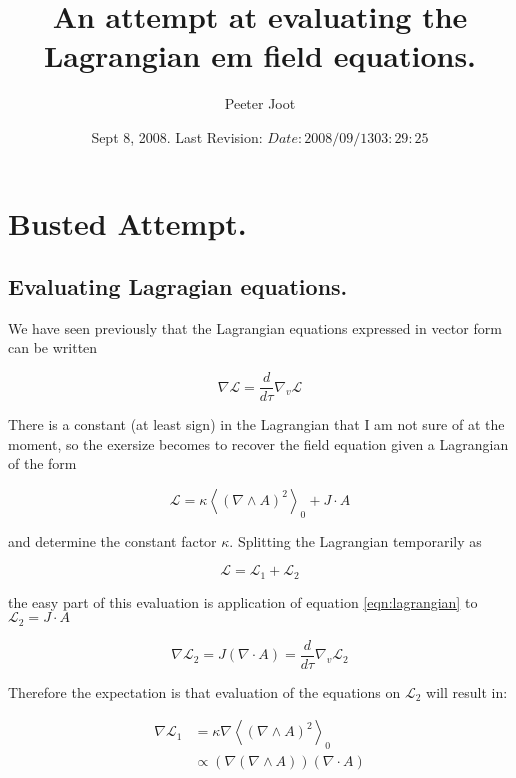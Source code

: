 \documentclass{article}
\title{ An attempt at evaluating the Lagrangian em field equations. }
\author{Peeter Joot}
\date{ Sept 8, 2008.  Last Revision: $Date: 2008/09/13 03:29:25 $ }
\newcommand{\LL}[0]{\mathcal{L}}
\newcommand{\gpgrade}[2] {{\left\langle{{#1}}\right\rangle}_{#2}}
\newcommand{\gpgradezero}[1] {\gpgrade{#1}{0}}
\newcommand{\grad}[0]{\nabla}
\begin{document}
\tableofcontents

\maketitle{}

\section{ Busted Attempt. }
\subsection{ Evaluating Lagragian equations. }

We have seen previously that the Lagrangian equations expressed in vector 
form can be written

\begin{equation}\label{eqn:lagrangian}
\grad \LL = \frac{d}{d\tau} \grad_v \LL
\end{equation}

There is a constant (at least sign) in the Lagrangian that I am not sure of
at the moment, so the exersize becomes to recover the field equation 
given a Lagrangian of the form

\begin{equation*}
\LL = \kappa \gpgradezero{ (\grad \wedge A)^2 } + J \cdot A
\end{equation*}

and determine the constant factor $\kappa$.  Splitting the Lagrangian temporarily as

\begin{equation*}
\LL = \LL_1 + \LL_2
\end{equation*}

the easy part of this evaluation is application of equation \ref{eqn:lagrangian} to $\LL_2 = J \cdot A$

\begin{equation}\label{eqn:maybewrong}
\grad \LL_2 = J (\grad \cdot A) = \frac{d}{d\tau} \grad_v \LL_2
\end{equation}

Therefore the expectation is that evaluation of the equations on $\LL_2$ will 
result in:

\begin{align*}
\grad \LL_1 
&= \kappa \grad \gpgradezero{ (\grad \wedge A)^2 } \\
&\propto (\grad (\grad \wedge A)) (\grad \cdot A)
\end{align*}
\end{document}
